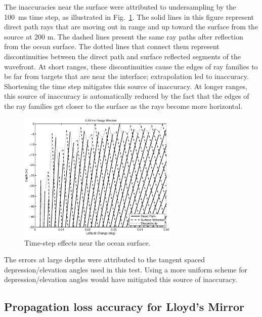 \documentclass{ws-jca}
\begin{document}
The inaccuracies near the surface were attributed to undersampling by the
100~ms time step, as illustrated in Fig.~\ref{fig:eigenray_lloyds_zoom}.
The solid lines in this figure represent direct path rays that are moving
out in range and up toward the surface from the source at 200 m. The dashed
lines present the same ray paths after reflection from the ocean surface.
The dotted lines that connect them represent discontinuities between the
direct path and surface reflected segments of the wavefront. At short
ranges, these discontinuities cause the edges of ray families to be far
from targets that are near the interface; extrapolation led to inaccuracy.
Shortening the time step mitigates this source of inaccuracy. At longer
ranges, this source of inaccuracy is automatically reduced by the fact that
the edges of the ray families get closer to the surface as the rays become
more horizontal.
\begin{figure}[th]
	\centerline{\includegraphics[width=3in]{eigenray_lloyds_zoom.eps}} 
	\vspace*{8pt}
	\caption{Time-step effects near the ocean surface.
	\label{fig:eigenray_lloyds_zoom}}
\end{figure}

The errors at large depths were attributed to the tangent spaced
depression/elevation angles used in this test. Using a more uniform scheme
for depression/elevation angles would have mitigated this source of
inaccuracy.

\subsection{Propagation loss accuracy for Lloyd's Mirror}
\end{document}
